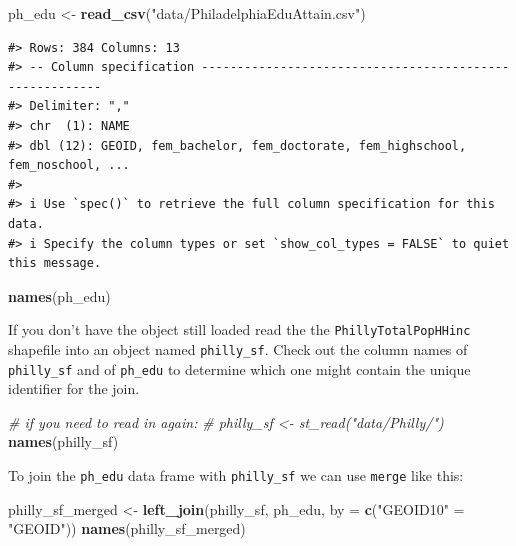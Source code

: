 \documentclass[
]{book}
\newenvironment{Shaded}{\begin{snugshade}}{\end{snugshade}}
\newcommand{\AttributeTok}[1]{\textcolor[rgb]{0.13,0.29,0.53}{#1}}
\newcommand{\CommentTok}[1]{\textcolor[rgb]{0.56,0.35,0.01}{\textit{#1}}}
\newcommand{\FunctionTok}[1]{\textcolor[rgb]{0.13,0.29,0.53}{\textbf{#1}}}
\newcommand{\NormalTok}[1]{#1}
\newcommand{\OtherTok}[1]{\textcolor[rgb]{0.56,0.35,0.01}{#1}}
\newcommand{\StringTok}[1]{\textcolor[rgb]{0.31,0.60,0.02}{#1}}
\begin{document}
\begin{Shaded}
\begin{Highlighting}[]
\NormalTok{ph\_edu }\OtherTok{\textless{}{-}} \FunctionTok{read\_csv}\NormalTok{(}\StringTok{"data/PhiladelphiaEduAttain.csv"}\NormalTok{)}
\end{Highlighting}
\end{Shaded}

\begin{verbatim}
#> Rows: 384 Columns: 13
#> -- Column specification --------------------------------------------------------
#> Delimiter: ","
#> chr  (1): NAME
#> dbl (12): GEOID, fem_bachelor, fem_doctorate, fem_highschool, fem_noschool, ...
#> 
#> i Use `spec()` to retrieve the full column specification for this data.
#> i Specify the column types or set `show_col_types = FALSE` to quiet this message.
\end{verbatim}

\begin{Shaded}
\begin{Highlighting}[]
\FunctionTok{names}\NormalTok{(ph\_edu)}
\end{Highlighting}
\end{Shaded}

If you don't have the object still loaded read the the \texttt{PhillyTotalPopHHinc} shapefile into an object named \texttt{philly\_sf}. Check out the column names of \texttt{philly\_sf} and of \texttt{ph\_edu} to determine which one might contain the unique identifier for the join.

\begin{Shaded}
\begin{Highlighting}[]
\CommentTok{\# if you need to read in again:}
\CommentTok{\# philly\_sf \textless{}{-} st\_read("data/Philly/")}
\FunctionTok{names}\NormalTok{(philly\_sf)}
\end{Highlighting}
\end{Shaded}

To join the \texttt{ph\_edu} data frame with \texttt{philly\_sf} we can use \texttt{merge} like this:

\begin{Shaded}
\begin{Highlighting}[]
\NormalTok{philly\_sf\_merged }\OtherTok{\textless{}{-}} \FunctionTok{left\_join}\NormalTok{(philly\_sf, ph\_edu, }\AttributeTok{by =} \FunctionTok{c}\NormalTok{(}\StringTok{"GEOID10"} \OtherTok{=} \StringTok{"GEOID"}\NormalTok{))}
\FunctionTok{names}\NormalTok{(philly\_sf\_merged) }
\end{Highlighting}
\end{Shaded}
\end{document}
